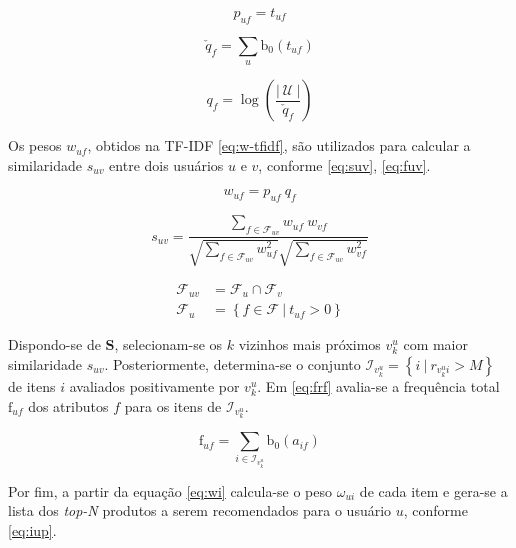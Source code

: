 \begin{equation}
\label{eq:tf} 
    p_{uf} = t_{uf}
\end{equation} 


\begin{equation}
\label{eq:uf} 
    \check{q}_{f} = \sum_{u}{\mathrm{b}_0\left(t_{uf}\right)}
\end{equation} 

\begin{equation}
\label{eq:iuf} 
    q_{f} = \log \left( \frac{\left|~\mathcal{U}~\right|}{\check{q}_{f}} \right)
\end{equation} 

Os pesos $w_{uf}$, obtidos na TF-IDF \ref{eq:w-tfidf}, são utilizados para calcular a similaridade $s_{uv}$ entre dois usuários $u$ e $v$, conforme \ref{eq:suv}, \ref{eq:fuv}.

\begin{equation}
\label{eq:w-tfidf} 
    w_{uf} = p_{uf}~q_{f}
\end{equation} 


\begin{equation}
\label{eq:suv}
    s_{uv} = \frac{\sum\limits_{f \in \mathcal{F}_{uv}}{w_{uf}~w_{vf}}}{\sqrt{\sum\limits_{f \in \mathcal{F}_{uv}
    }w_{uf}^2} \sqrt{\sum\limits_{f \in \mathcal{F}_{uv}}w_{vf}^2}} 
\end{equation} 

\begin{equation}
\label{eq:fuv}
\begin{split}
    \mathcal{F}_{uv} &= \mathcal{F}_u \cap \mathcal{F}_v \\
    \mathcal{F}_u &= \left\{ f \in \mathcal{F}~|~t_{uf} > 0 \right\}
\end{split}    
\end{equation} 

Dispondo-se de $\mathbf{S}$, selecionam-se os $k$ vizinhos mais próximos $v_k^u$ com maior similaridade $s_{uv}$.  Posteriormente, determina-se o conjunto $\mathcal{I}_{v_k^u} = \left\{ i ~|~ r_{v_k^u i} > M\right\}$ de itens $i$ avaliados positivamente por $v_k^u$. Em \ref{eq:frf} avalia-se a frequência total $\mathrm{f}_{uf}$ dos atributos $f$ para os itens de $\mathcal{I}_{v_k^u}$. 

\begin{equation}
\label{eq:frf} 
\mathrm{f}_{uf} = \sum_{i \in \mathcal{I}_{v_k^u}}{\mathrm{b}_0\left(a_{if}\right)}
\end{equation} 

Por fim, a partir da equação \ref{eq:wi} calcula-se o peso $\omega_{ui}$ de cada item e gera-se a lista dos \textit{top-N} produtos a serem recomendados para o usuário $u$, conforme \ref{eq:iup}. 

